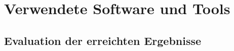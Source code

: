 \chapter{Verwendete Software und Tools}\label{sec:technik}

\clearpage
\section{Evaluation der erreichten Ergebnisse}